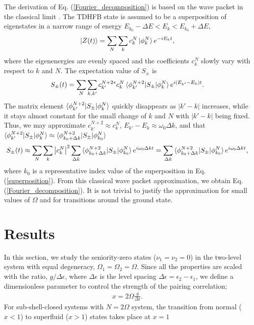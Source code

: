 \documentclass[%
superscriptaddress,
preprint,
showpacs,
nofootinbib,
amsmath,amssymb,
prc,
floatfix ]%
{revtex4-1}
\begin{document}
The derivation  of Eq. (\ref{Fourier_decomposition})
is based on the wave packet in the
classical limit \cite{LL65}.
The TDHFB state is assumed to be a superposition of eigenstates
in a narrow range of energy $E_{k_0}-\Delta E<E_k<E_{k_0}+\Delta E$,
\begin{equation}
	\ket{Z(t)} = \sum_N \sum_k c_k^N \ket{\phi_k^N} e^{-iE_k t} ,
	\label{superposition}
\end{equation}
where the eigenenergies are evenly spaced and
the coefficients $c_k^N$ slowly vary with respect to $k$ and $N$.
The expectation value of $S_\pm$ is
\begin{equation}
	S_\pm(t) = \sum_{N} \sum_{k,k'} c_{k'}^{N+2*} c_k^N 
	\braket{\phi_{k'}^{N+2}|S_\pm|\phi_k^N} e^{i(E_{k'}-E_k)t} .
\end{equation}
The matrix element $\braket{\phi_{k'}^{N+2}|S_\pm|\phi_k^N}$
quickly disappears as $|k'-k|$ increases, while it stays almost constant
for the small change of $k$ and $N$ with $|k'-k|$ being fixed.
Thus, we may approximate $c_{k'}^{N+2}\approx c_k^N$,
$E_{k'}-E_k\approx \omega_0 \Delta k$, and
that $\braket{\phi_{k'}^{N+2}|S_\pm|\phi_k^N}\approx
\braket{\phi_{k_0+\Delta k}^{N+2}|S_\pm|\phi_{k_0}^N}$ 
\begin{equation}
	S_\pm(t) \approx \sum_{N} \sum_{k} \left|c_k^N\right|^2
	\sum_{\Delta k}
	\braket{\phi_{k_0+\Delta k}^{N+2}|S_\pm|\phi_{k_0}^N}
	e^{i\omega_0 \Delta k t} 
	= \sum_{\Delta k}
	\braket{\phi_{k_0+\Delta k}^{N+2}|S_\pm|\phi_{k_0}^N}
	e^{i\omega_0 \Delta k t}  ,
\end{equation}
where $k_0$ is a representative index value of the superposition in 
Eq. (\ref{superposition}).
From this classical wave packet approximation,
we obtain Eq. (\ref{Fourier_decomposition}).
It is not trivial to justify the approximation for small values of $\Omega$
and for transitions around the ground state.






\section{Results}
\label{sec:results}

In this section, we study the seniority-zero states ($\nu_1=\nu_2=0$) in
the two-level system with equal degeneracy, $\Omega_1=\Omega_2=\Omega$.
Since all the properties are scaled with the ratio, $g/\Delta\epsilon$,
where $\Delta\epsilon$ is the level spacing
$\Delta\epsilon=\epsilon_2-\epsilon_1$,
we define a dimensionless parameter to control the strength of
the pairing correlation;
\begin{align}
  x = 2\Omega\frac{g}{\Delta\epsilon} .
\end{align}
For sub-shell-closed systems with $N=2\Omega$ system,
the transition from normal ($x<1$) to superfluid ($x>1$) states
takes place at $x=1$
\end{document}
